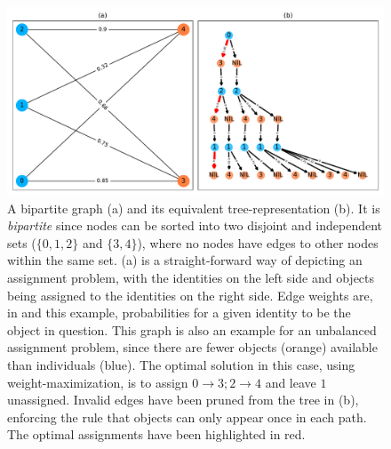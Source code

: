 \documentclass[9pt,lineno]{elife}
\newcommand{\TRex}{\protect\path{TRex}}
\begin{document}
\begin{figure}
\includegraphics[width=1.0\textwidth]{tree.pdf}
\caption{A bipartite graph (a) and its equivalent tree-representation (b). It is \textit{bipartite} since nodes can be sorted into two disjoint and independent sets ($\{0,1,2\}$ and $\{3,4\}$), where no nodes have edges to other nodes within the same set. (a) is a straight-forward way of depicting an assignment problem, with the identities on the left side and objects being assigned to the identities on the right side. Edge weights are, in \TRex{} and this example, probabilities for a given identity to be the object in question. This graph is also an example for an unbalanced assignment problem, since there are fewer objects (orange) available than individuals (blue). The optimal solution in this case, using weight-maximization, is to assign $0\rightarrow3; 2\rightarrow4$ and leave $1$ unassigned. Invalid edges have been pruned from the tree in (b), enforcing the rule that objects can only appear once in each path. The optimal assignments have been highlighted in red.}
\label{fig:bipartite_graph}
\end{figure}
\end{document}

